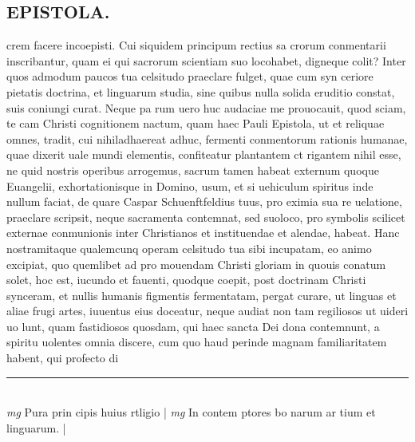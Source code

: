 \documentclass{article}
\begin{document}
\begin{pages}
\section*{EPISTOLA. }\pstart crem facere incoepisti. Cui siquidem principum rectius sa crorum conmentarii inscribantur, quam ei qui sacrorum scientiam suo locohabet, digneque colit? Inter quos admodum paucos tua celsitudo praeclare fulget, quae cum syn ceriore pietatis doctrina, et linguarum studia, sine quibus nulla solida eruditio constat, suis coniungi curat. Neque pa rum uero huc audaciae me prouocauit, quod sciam, te cam Christi cognitionem nactum, quam haec Pauli Epistola, ut et reliquae omnes, tradit, cui nihiladhaereat adhuc, fermenti conmentorum rationis humanae, quae dixerit uale mundi elementis, confiteatur plantantem ct rigantem nihil esse, ne quid nostris operibus arrogemus, sacrum tamen habeat externum quoque Euangelii, exhortationisque in Domino, usum, et si uehiculum spiritus inde nullum faciat, de quare Caspar Schuenftfeldius tuus, pro eximia sua re uelatione, praeclare scripsit, neque sacramenta contemnat, sed suoloco, pro symbolis scilicet externae conmunionis inter Christianos et instituendae et alendae, habeat.  \pend\pstart Hanc nostramitaque qualemcunq operam celsitudo tua sibi incupatam, eo animo excipiat, quo quemlibet ad pro mouendam Christi gloriam in quouis conatum solet, hoc est, iucundo et fauenti, quodque coepit, post doctrinam Christi synceram, et nullis humanis figmentis fermentatam, pergat curare, ut linguas et aliae frugi artes, iuuentus eius doceatur, neque audiat non tam regiliosos ut uideri uo lunt, quam fastidiosos quosdam, qui haec sancta Dei dona contemnunt, a spiritu uolentes omnia discere, cum quo haud perinde magnam familiaritatem habent, qui profecto di\pend
\vspace{0.5cm}\noindent
\vspace{0.2cm}\rule{1cm}{0.2pt}\\ 
\hspace{0.2cm}\textit{mg}
\footnotesize Pura prin cipis huius rtligio
\normalsize| 
\hspace{0.2cm}\textit{mg}
\footnotesize In contem ptores bo narum ar tium et linguarum. 
\normalsize| 

\end{pages}
\end{document}
